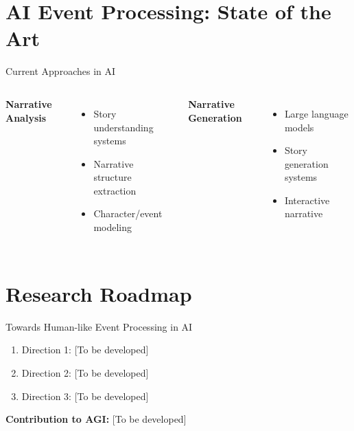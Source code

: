 \documentclass[aspectratio=169]{beamer}
\begin{document}
\section{AI Event Processing: State of the Art}

\begin{frame}{Current Approaches in AI}
  
  \begin{columns}
    \textbf{Narrative Analysis}
    \begin{itemize}
      \item Story understanding systems
      \item Narrative structure extraction
      \item Character/event modeling
    \end{itemize}
    
    \textbf{Narrative Generation}
    \begin{itemize}
      \item Large language models
      \item Story generation systems
      \item Interactive narrative
    \end{itemize}
  \end{columns}
\end{frame}

\section{Research Roadmap}

\begin{frame}{Towards Human-like Event Processing in AI}
  
  \begin{enumerate}
    \item Direction 1: [To be developed]
    \item Direction 2: [To be developed]
    \item Direction 3: [To be developed]
  \end{enumerate}
  
  \vspace{1em}
  
  \textbf{Contribution to AGI:} [To be developed]
\end{frame}
\end{document}
